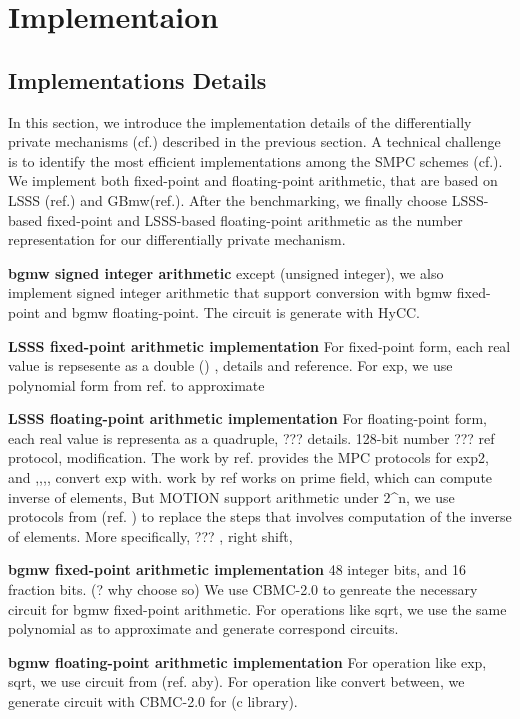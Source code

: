 \chapter{Implementaion}
\label{cha:implementations}


\section{Implementations Details}
\label{sec:implementationsdetails}

In this section, we introduce the implementation details of the differentially private mechanisms (cf.) described in the previous section. A technical challenge is to identify the most efficient implementations among the SMPC schemes (cf.). We implement both fixed-point and floating-point arithmetic, that are based on LSSS (ref.) and GBmw(ref.). After the benchmarking, we finally choose LSSS-based fixed-point and LSSS-based floating-point arithmetic as the number representation for our differentially private mechanism. 

\textbf{bgmw signed integer arithmetic}
except (unsigned integer), we also implement signed integer arithmetic that support conversion with bgmw fixed-point and bgmw floating-point. The circuit is generate with HyCC. 


\textbf{LSSS fixed-point arithmetic implementation}
For fixed-point form, each real value is repsesente as a double () , details and reference. For exp, we use polynomial form from ref. to approximate 

\textbf{LSSS floating-point arithmetic implementation}
For floating-point form, each real value is representa as a quadruple, ??? details.
128-bit number
??? ref protocol, modification. The work by ref. provides the MPC protocols for exp2, and ,,,,
convert exp with. 
work by ref works on prime field, which can compute inverse of elements,
But MOTION support arithmetic under 2^n, we use protocols from (ref. ) to replace the steps that involves computation of the inverse of elements. More specifically, ??? , right shift, 



\textbf{bgmw fixed-point arithmetic implementation}
48 integer bits, and 16 fraction bits. (? why choose so)
We use CBMC-2.0 to genreate the necessary circuit for bgmw fixed-point arithmetic. For operations like sqrt, we use the same polynomial as to approximate and generate correspond circuits. 


\textbf{bgmw floating-point arithmetic implementation}
For operation like exp, sqrt, we use circuit from (ref. aby). 
For operation like convert between, we generate circuit with CBMC-2.0 for (c library).



